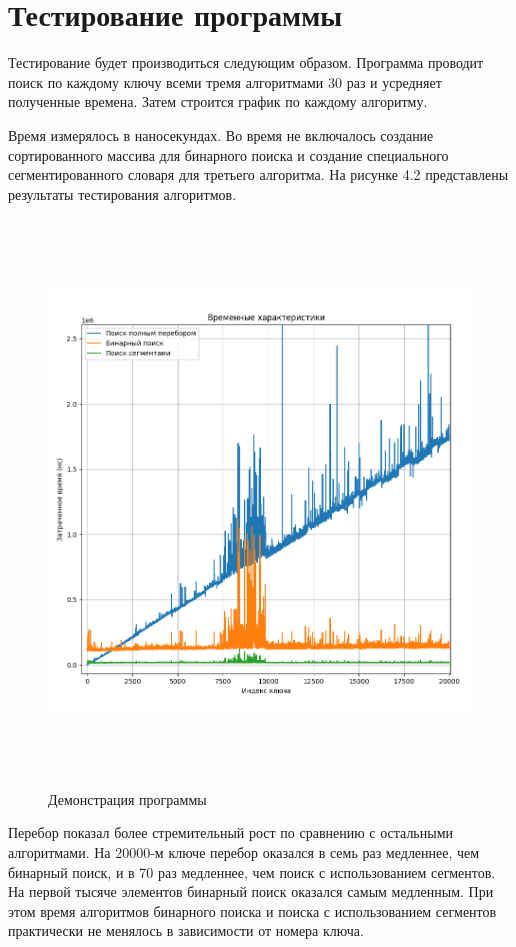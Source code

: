 \section{Тестирование программы}
Тестирование будет производиться следующим образом.
Программа проводит поиск по каждому ключу всеми тремя алгоритмами 30 раз и усредняет полученные времена.
Затем строится график по каждому алгоритму.

Время измерялось в наносекундах. Во время не включалось создание сортированного массива для бинарного поиска и создание 
специального сегментированного словаря для третьего алгоритма.
На рисунке 4.2 представлены результаты тестирования алгоритмов.

\FloatBarrier
\begin{figure}[h]
	\begin{center}
		\includegraphics[width=\linewidth, height = 15cm]{inc/graph.png}
	\end{center}
	\caption{Демонстрация программы}
\end{figure}
\FloatBarrier

Перебор показал более стремительный рост по сравнению с остальными алгоритмами. 
На 20000-м ключе перебор оказался в семь раз медленнее, чем бинарный поиск, и в 70 раз медленнее, чем поиск с использованием сегментов.
На первой тысяче элементов бинарный поиск оказался самым медленным.
При этом время алгоритмов бинарного поиска и поиска с использованием сегментов практически не менялось в зависимости от номера ключа.

